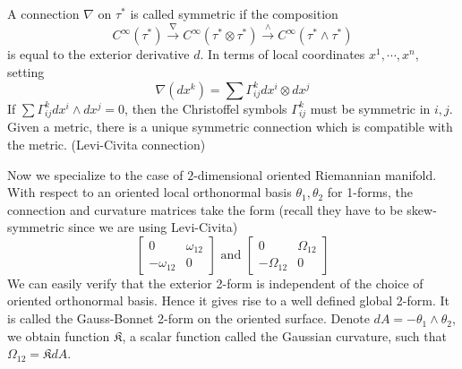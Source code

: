 \documentclass[12pt]{article}
\theoremstyle{plain}
\theoremstyle{definition}
\newcommand{\sK}{\mathfrak{K}}
\newcommand\tensor{{\otimes}}
\newcommand{\<}{\langle}
\renewcommand{\>}{\rangle}
\newcommand{\w}{\omega}
\newcommand{\Ohm}{\Omega}
\begin{document}
A connection $\nabla$ on $\tau^*$ is called symmetric if the composition 
$$ C^\infty(\tau^*) \stackrel{\nabla}{\to} C^\infty(\tau^* \tensor \tau^*) \stackrel{\wedge}{\to} C^\infty(\tau^* \wedge \tau^*) $$
is equal to the exterior derivative $d$. 
In terms of local coordinates $x^1, \cdots, x^n$, setting
$$ \nabla(dx^k) = \sum \Gamma^k_{ij} dx^i \tensor dx^j $$
If $\sum \Gamma^k_{ij} dx^i \wedge dx^j  = 0$, then the Christoffel symbols $\Gamma^k_{ij}$ must be symmetric in $i,j$. Given a metric, there is a unique symmetric connection which is compatible with the metric. (Levi-Civita connection)

Now we specialize to the case of $2$-dimensional oriented Riemannian manifold. With respect to an oriented local orthonormal basis $\theta_1, \theta_2$ for 1-forms, the connection and curvature matrices take the form (recall they have to be skew-symmetric since we are using Levi-Civita)
$$\begin{bmatrix}
0 & \w_{12} \\ - \w_{12} & 0 
\end{bmatrix} \text{ and }
\begin{bmatrix}
0 & \Ohm_{12} \\ - \Ohm_{12} & 0 
\end{bmatrix}
$$
We can easily verify that the exterior 2-form is independent of the choice of oriented orthonormal basis. Hence it gives rise to a well defined global 2-form. It is called the Gauss-Bonnet 2-form on the oriented surface. Denote $dA = - \theta_1 \wedge \theta_2$, we obtain function $\sK$, a scalar function called the Gaussian curvature, such that $\Ohm_{12} = \sK dA$. 
\end{document}
